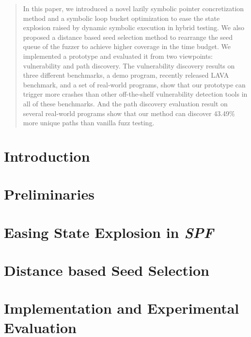 \documentclass{cta-author}
\begin{document}
\begin{abstract}
In this paper, we introduced a novel lazily symbolic pointer concretization method and a symbolic loop bucket optimization to ease the state explosion raised by dynamic symbolic execution in hybrid testing.
We also proposed a distance based seed selection method to rearrange the seed queue of the fuzzer to achieve higher coverage in the time budget. We implemented a prototype and evaluated it from two viewpoints: vulnerability and path discovery. 
The vulnerability discovery results on three different benchmarks,
a demo program, recently released LAVA benchmark, and a set of real-world programs, show that our prototype can trigger more crashes than other off-the-shelf vulnerability detection tools in all of these benchmarks. And the path discovery evaluation result on several real-world programs show that our method can discover 43.49\% more unique paths than vanilla fuzz testing.
\end{abstract}

\maketitle

\section{Introduction} \label{sec:introduction}



\section{Preliminaries} \label{sec:preliminaries}


\section{Easing State Explosion in \textit{SPF}} \label{sec:ease PE}

%
\section{Distance based Seed Selection} \label{sec:seed selection}

%
\section{Implementation and Experimental Evaluation} \label{sec:evaluate}



\end{document}
